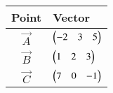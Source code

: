 \begin{tabular}{|c|p{3cm}|}
    \hline
    \textbf{Point} &\textbf{Vector} \\
    \hline
         $\vec{A}$ & $\begin{pmatrix}-2 & 3 & 5\end{pmatrix}$  \\
    \hline
        $\vec{B}$ & $\begin{pmatrix}1 & 2 & 3\end{pmatrix}$ \\
    \hline
        $\vec{C}$ & $\begin{pmatrix}7 & 0 & -1\end{pmatrix}$  \\
    \hline
\end{tabular}
